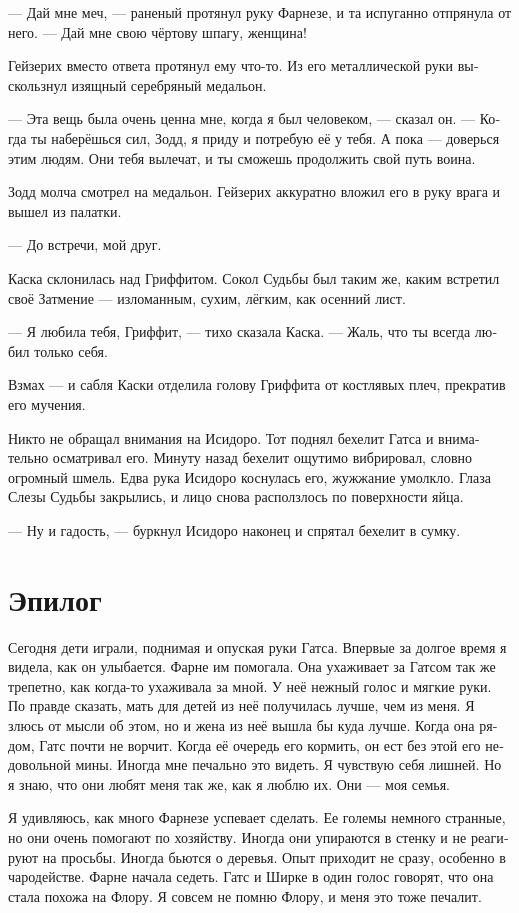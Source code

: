\documentclass[a4paper,12pt,fleqn]{book}\usepackage{polyglossia}\setdefaultlanguage[babelshorthands=true]{russian}\setotherlanguage{english}\defaultfontfeatures{Ligatures=TeX,Mapping=tex-text}\usepackage{xcolor}\newcommand{\ml}[3]{#2}
\newcommand{\textspace}{\vspace{1em}{\centering\Large\bfseries<...>\par}\vspace{1em}}
\begin{document}
--- Дай мне меч, --- раненый протянул руку Фарнезе, и та испуганно отпрянула от него.
--- Дай мне свою чёртову шпагу, женщина!

Гейзерих вместо ответа протянул ему что-то.
Из его металлической руки выскользнул изящный серебряный медальон.

--- Эта вещь была очень ценна мне, когда я был человеком, --- сказал он.
--- Когда ты наберёшься сил, Зодд, я приду и потребую её у тебя.
А пока --- доверься этим людям.
Они тебя вылечат, и ты сможешь продолжить свой путь воина.

Зодд молча смотрел на медальон.
Гейзерих аккуратно вложил его в руку врага и вышел из палатки.

--- До встречи, мой друг.

\textspace

Каска склонилась над Гриффитом.
Сокол Судьбы был таким же, каким встретил своё Затмение --- изломанным, сухим, лёгким, как осенний лист.

--- Я любила тебя, Гриффит, --- тихо сказала Каска.
--- Жаль, что ты всегда любил только себя.

Взмах --- и сабля Каски отделила голову Гриффита от костлявых плеч, прекратив его мучения.

Никто не обращал внимания на Исидоро.
Тот поднял бехелит Гатса и внимательно осматривал его.
Минуту назад бехелит ощутимо вибрировал, словно огромный шмель.
Едва рука Исидоро коснулась его, жужжание умолкло.
Глаза Слезы Судьбы закрылись, и лицо снова расползлось по поверхности яйца.

--- Ну и гадость, --- буркнул Исидоро наконец и спрятал бехелит в сумку.

\section{Эпилог}

Сегодня дети играли, поднимая и опуская руки Гатса.
Впервые за долгое время я видела, как он улыбается.
Фарне им помогала.
Она ухаживает за Гатсом так же трепетно, как когда-то ухаживала за мной.
У неё нежный голос и мягкие руки.
По правде сказать, мать для детей из неё получилась лучше, чем из меня.
Я злюсь от мысли об этом, но и жена из неё вышла бы куда лучше.
Когда она рядом, Гатс почти не ворчит.
Когда её очередь его кормить, он ест без этой его недовольной мины.
Иногда мне печально это видеть.
Я чувствую себя лишней.
Но я знаю, что они любят меня так же, как я люблю их.
Они --- моя семья.

Я удивляюсь, как много Фарнезе успевает сделать.
Ее големы немного странные, но они очень помогают по хозяйству.
Иногда они упираются в стенку и не реагируют на просьбы.
Иногда бьются о деревья.
Опыт приходит не сразу, особенно в чародействе.
Фарне начала седеть.
Гатс и Ширке в один голос говорят, что она стала похожа на Флору.
Я совсем не помню Флору, и меня это тоже печалит.
\end{document}
